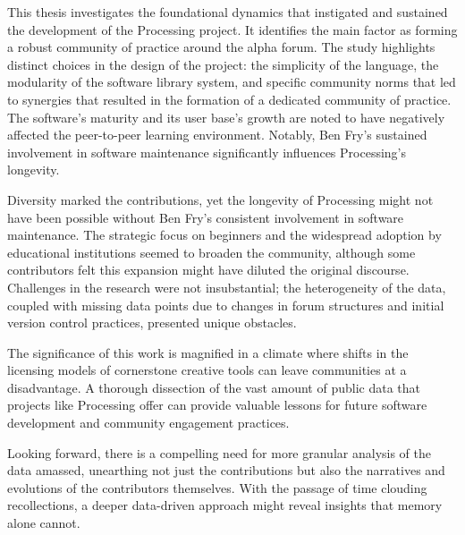 



This thesis investigates the foundational dynamics that instigated and sustained the development of the Processing project. It identifies the main factor as forming a robust community of practice around the alpha forum. The study highlights distinct choices in the design of the project: the simplicity of the language, the modularity of the software library system, and specific community norms that led to synergies that resulted in the formation of a dedicated community of practice. The software's maturity and its user base's growth are noted to have negatively affected the peer-to-peer learning environment. Notably, Ben Fry's sustained involvement in software maintenance significantly influences Processing's longevity.


Diversity marked the contributions, yet the longevity of Processing might not have been possible without Ben Fry's consistent involvement in software maintenance. The strategic focus on beginners and the widespread adoption by educational institutions seemed to broaden the community, although some contributors felt this expansion might have diluted the original discourse. Challenges in the research were not insubstantial; the heterogeneity of the data, coupled with missing data points due to changes in forum structures and initial version control practices, presented unique obstacles.

The significance of this work is magnified in a climate where shifts in the licensing models of cornerstone creative tools can leave communities at a disadvantage. A thorough dissection of the vast amount of public data that projects like Processing offer can provide valuable lessons for future software development and community engagement practices.

Looking forward, there is a compelling need for more granular analysis of the data amassed, unearthing not just the contributions but also the narratives and evolutions of the contributors themselves. With the passage of time clouding recollections, a deeper data-driven approach might reveal insights that memory alone cannot.

